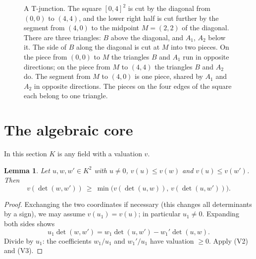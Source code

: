 \documentclass[11pt]{article}
\newtheorem{lemma}[theorem]{Lemma}
\theoremstyle{definition}
\begin{document}
\begin{figure}[ht]
\centering
{}
\caption{A T-junction. The square $[0,4]^2$ is cut by the diagonal from $(0,0)$ to $(4,4)$,
and the lower right half is cut further by the segment from $(4,0)$ to the midpoint $M=(2,2)$ of the
diagonal. There are three triangles: $B$ above the diagonal, and $A_1$, $A_2$ below it. The side of
$B$ along the diagonal is cut at $M$ into two pieces. On the piece from $(0,0)$ to $M$ the triangles
$B$ and $A_1$ run in opposite directions; on the piece from $M$ to $(4,4)$ the triangles $B$ and
$A_2$ do. The segment from $M$ to $(4,0)$ is one piece, shared by $A_1$ and $A_2$ in opposite
directions. The pieces on the four edges of the square each belong to one triangle.}\label{fig:balance}
\end{figure}

\section{The algebraic core}\label{sec:core}

In this section $K$ is any field with a valuation $v$.

\begin{lemma}\label{lem:T}
Let $u,w,w'\in K^2$ with $u\ne0$, $v(u)\le v(w)$ and $v(u)\le v(w')$. Then
\[ v(\det(w,w'))\ \ge\ \min\bigl(v(\det(u,w)),\,v(\det(u,w'))\bigr). \]
\end{lemma}

\begin{proof}
Exchanging the two coordinates if necessary (this changes all determinants by a sign), we may assume
$v(u_1)=v(u)$; in particular $u_1\ne0$. Expanding both sides shows
\[ u_1\det(w,w')=w_1\det(u,w')-w_1'\det(u,w). \]
Divide by $u_1$: the coefficients $w_1/u_1$ and $w_1'/u_1$ have valuation $\ge0$. Apply (V2) and
(V3).
\end{proof}
\end{document}
